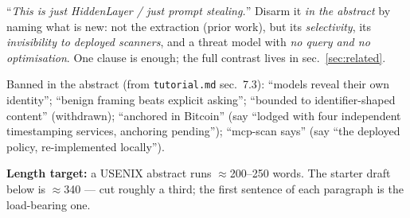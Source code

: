 \documentclass[11pt]{article}
\begin{document}
\begin{trapbox}
``\emph{This is just HiddenLayer / just prompt stealing.}'' Disarm it \emph{in the abstract} by naming what is new: not the extraction (prior work), but its \emph{selectivity}, its \emph{invisibility to deployed scanners}, and a threat model with \emph{no query and no optimisation}. One clause is enough; the full contrast lives in sec.~\ref{sec:related}.
\end{trapbox}

\begin{phrasebox}
Banned in the abstract (from \texttt{tutorial.md} sec.~7.3): ``models reveal their own identity''; ``benign framing beats explicit asking''; ``bounded to identifier-shaped content'' (withdrawn); ``anchored in Bitcoin'' (say ``lodged with four independent timestamping services, anchoring pending''); ``mcp-scan says'' (say ``the deployed policy, re-implemented locally'').

\medskip\noindent\textbf{Length target:} a USENIX abstract runs $\approx$200--250 words. The starter draft below is $\approx$340 --- cut roughly a third; the first sentence of each paragraph is the load-bearing one.
\end{phrasebox}
\end{document}
